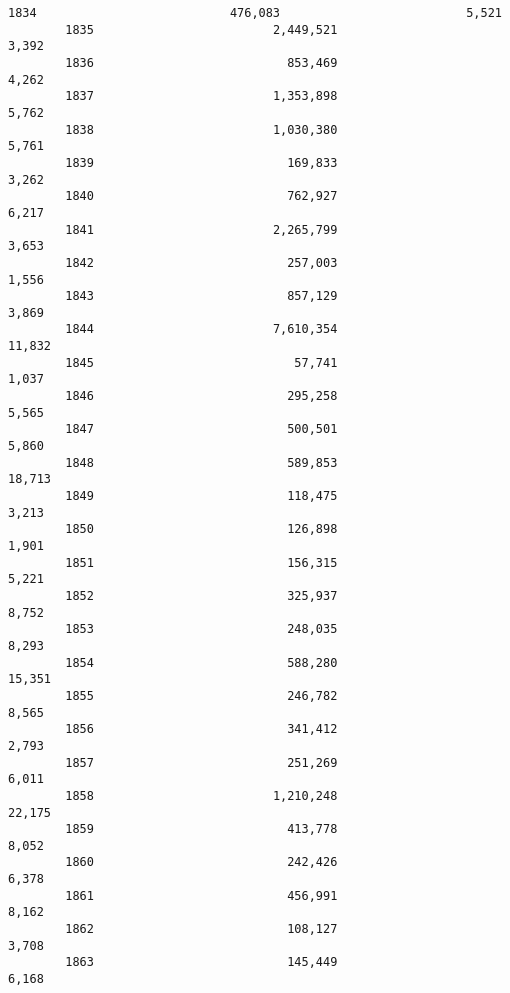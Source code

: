 \documentclass[11pt]{article}
\begin{document}
\begin{Verbatim}[commandchars=\\\{\}]
        1834                           476,083                          5,521   
        1835                         2,449,521                          3,392   
        1836                           853,469                          4,262   
        1837                         1,353,898                          5,762   
        1838                         1,030,380                          5,761   
        1839                           169,833                          3,262   
        1840                           762,927                          6,217   
        1841                         2,265,799                          3,653   
        1842                           257,003                          1,556   
        1843                           857,129                          3,869   
        1844                         7,610,354                         11,832   
        1845                            57,741                          1,037   
        1846                           295,258                          5,565   
        1847                           500,501                          5,860   
        1848                           589,853                         18,713   
        1849                           118,475                          3,213   
        1850                           126,898                          1,901   
        1851                           156,315                          5,221   
        1852                           325,937                          8,752   
        1853                           248,035                          8,293   
        1854                           588,280                         15,351   
        1855                           246,782                          8,565   
        1856                           341,412                          2,793   
        1857                           251,269                          6,011   
        1858                         1,210,248                         22,175   
        1859                           413,778                          8,052   
        1860                           242,426                          6,378   
        1861                           456,991                          8,162   
        1862                           108,127                          3,708   
        1863                           145,449                          6,168   
        

\end{Verbatim}
\end{document}
